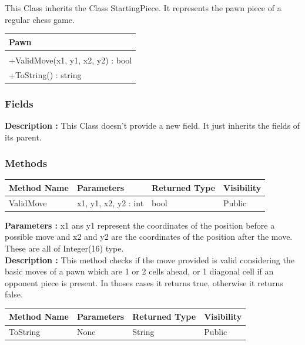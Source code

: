 \documentclass[12pt]{article}
\begin{document}
This Class inherits the Class StartingPiece. It represents the pawn 
piece of a regular chess game.
\begin{table}[H]
    \begin{tabular}{|l|}
    \hline
    \cellcolor[HTML]{C0C0C0}\textbf{Pawn} \\ \hline
    \cellcolor[HTML]{EFEFEF}                    \\ \hline
    +ValidMove(x1, y1, x2, y2) : bool           \\ \hline
    +ToString() : string                        \\ \hline
    \end{tabular}
\end{table}

\subsubsection{Fields}

\textbf{Description :} This Class doesn't provide a new field. It just
inherits the fields of its parent.

\subsubsection{Methods}

\begin{table}[H]
    \begin{tabular}{|l|l|l|l|}
    \hline
    \rowcolor[HTML]{EFEFEF} 
    \cellcolor[HTML]{EFEFEF}\textbf{Method Name} & \textbf{Parameters}  & \textbf{Returned Type} & \textbf{Visibility} \\ \hline
    ValidMove                          & x1, y1, x2, y2 : int & bool                   & Public              \\ \hline
    \end{tabular}
\end{table}

\textbf{Parameters :} x1 ans y1 represent the coordinates of the position before a possible move
and x2 and y2 are the coordinates of the position after the move. These are all of Integer(16) type.
\\
\textbf{Description :} This method checks
if the move provided is valid considering the basic moves of a pawn which
are 1 or 2 cells ahead, or 1 diagonal cell if an opponent piece is
present. In thoses cases it returns true, otherwise it returns false. 

\begin{table}[H]
    \begin{tabular}{|l|l|l|l|}
    \hline
    \rowcolor[HTML]{EFEFEF} 
    \cellcolor[HTML]{EFEFEF}\textbf{Method Name} & \textbf{Parameters}  & \textbf{Returned Type} & \textbf{Visibility} \\ \hline
    ToString                                   & None                 & String                   & Public              \\ \hline
    \end{tabular}
\end{table}
\end{document}
